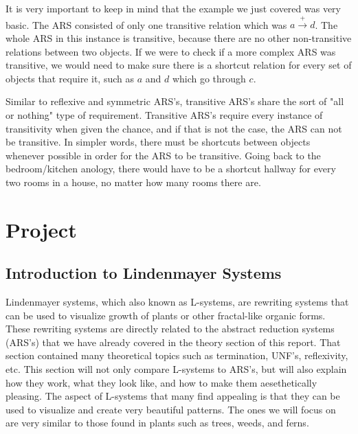 \documentclass{article}
\begin{document}
\medskip\noindent
It is very important to keep in mind that the example we just covered was very basic. The ARS consisted of only one transitive relation which was $a \xrightarrow{+} d$. The whole ARS in this instance is transitive, because there are no other non-transitive relations between two objects. If we were to check if a more complex ARS was transitive, we would need to make sure there is a shortcut relation for every set of objects that require it, such as $a$ and $d$ which go through $c$.

\medskip\noindent
Similar to reflexive and symmetric ARS's, transitive ARS's share the sort of "all or nothing" type of requirement. Transitive ARS's require every instance of transitivity when given the chance, and if that is not the case, the ARS can not be transitive. In simpler words, there must be shortcuts between objects whenever possible in order for the ARS to be transitive. Going back to the bedroom/kitchen anology, there would have to be a shortcut hallway for every two rooms in a house, no matter how many rooms there are.


\section{Project}

\subsection{Introduction to Lindenmayer Systems}

\medskip\noindent
Lindenmayer systems, which also known as L-systems, are rewriting systems that can be used to visualize growth of plants or other fractal-like organic forms. These rewriting systems are directly related to the abstract reduction systems (ARS's) that we have already covered in the theory section of this report. That section contained many theoretical topics such as termination, UNF's, reflexivity, etc. This section will not only compare L-systems to ARS's, but will also explain how they work, what they look like, and how to make them aesethetically pleasing. The aspect of L-systems that many find appealing is that they can be used to visualize and create very beautiful patterns. The ones we will focus on are very similar to those found in plants such as trees, weeds, and ferns.
\end{document}
